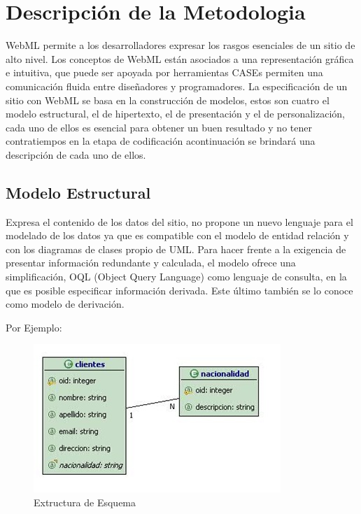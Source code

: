 \chapter{Descripci\'on de la Metodologia}

WebML permite a los desarrolladores expresar los rasgos esenciales de un sitio 
de alto nivel. Los conceptos de WebML est\'an asociados a una representaci\'on 
gr\'afica e intuitiva, que puede ser apoyada por herramientas CASEs permiten una 
comunicaci\'on fluida entre dise\~nadores y programadores. La especificaci\'on de un
sitio con WebML se basa en la construcci\'on de modelos, estos son cuatro el
modelo estructural, el de hipertexto, el de presentaci\'on y el de 
personalizaci\'on, cada uno de ellos es esencial para obtener un buen 
resultado y no tener contratiempos en la etapa de codificaci\'on acontinuaci\'on se
brindar\'a una descripci\'on de cada uno de ellos.

\section{Modelo Estructural}

Expresa el contenido de los datos del sitio, no propone un nuevo lenguaje para 
el modelado de los datos ya que es compatible con el modelo de entidad relaci\'on 
y con los diagramas de clases propio de UML. Para hacer frente a la exigencia 
de presentar informaci\'on redundante y calculada, el modelo ofrece una 
simplificaci\'on, OQL (Object Query Language) como lenguaje de consulta, en la
que es posible especificar informaci\'on derivada. Este \'ultimo tambi\'en se lo
conoce como modelo de derivaci\'on. 

Por Ejemplo:

\begin{figure}[H]
    \centering
    \includegraphics[scale=1]{resourse/extructura-esquema.jpg}
    \caption{Extructura de Esquema}
    \label{fig:01}
\end{figure}  

